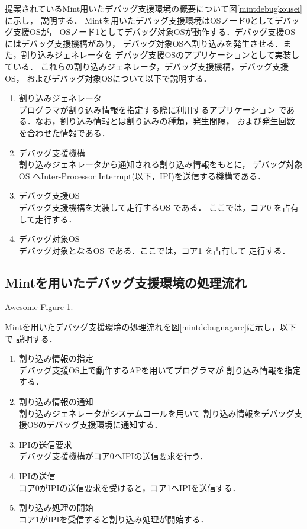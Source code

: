 \documentclass[tanilab-enum]{graduate}
\begin{document}
    提案されているMint用いたデバッグ支援環境の概要について図\ref{mintdebugkousei}に示し，
    説明する．
    Mintを用いたデバッグ支援環境はOSノード0としてデバッグ支援OSが，
    OSノード1としてデバッグ対象OSが動作する．デバッグ支援OSにはデバッグ支援機構があり，
    デバッグ対象OSへ割り込みを発生させる．また，割り込みジェネレータを
    デバッグ支援OSのアプリケーションとして実装している．
    これらの割り込みジェネレータ，デバッグ支援機構，デバッグ支援OS，
    およびデバッグ対象OSについて以下で説明する．
    \begin{enumerate}
        \item 割り込みジェネレータ\\
            プログラマが割り込み情報を指定する際に利用するアプリケーション
            である．なお，割り込み情報とは割り込みの種類，発生間隔，
            および発生回数を合わせた情報である．
        \item デバッグ支援機構\\
            割り込みジェネレータから通知される割り込み情報をもとに，
            デバッグ対象OS へInter-Processor Interrupt(以下，IPI)を送信する機構である．
        \item デバッグ支援OS\\
            デバッグ支援機構を実装して走行するOS である．
            ここでは，コア0 を占有して走行する．
        \item デバッグ対象OS\\
            デバッグ対象となるOS である．ここでは，コア1 を占有して
            走行する．
    \end{enumerate}
    \subsection{Mintを用いたデバッグ支援環境の処理流れ}
    {Awesome Figure 1.}

    Mintを用いたデバッグ支援環境の処理流れを図\ref{mintdebugnagare}に示し，以下で
    説明する．
    \begin{enumerate}
        \item 割り込み情報の指定\\
            デバッグ支援OS上で動作するAPを用いてプログラマが
            割り込み情報を指定する．
        \item 割り込み情報の通知\\
            割り込みジェネレータがシステムコールを用いて
            割り込み情報をデバッグ支援OSのデバッグ支援環境に通知する．
        \item IPIの送信要求\\
            デバッグ支援機構がコア0へIPIの送信要求を行う．
        \item IPIの送信\\
            コア0がIPIの送信要求を受けると，コア1へIPIを送信する．
        \item 割り込み処理の開始\\
            コア1がIPIを受信すると割り込み処理が開始する．
    \end{enumerate}
\end{document}
